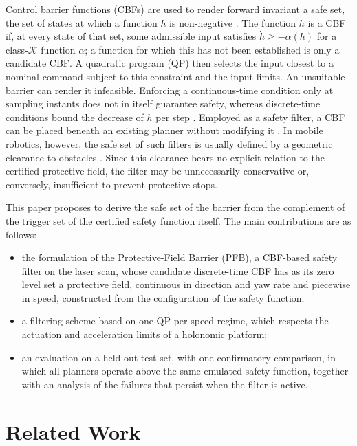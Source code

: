 \documentclass[conference]{IEEEtran}
\begin{document}
Control barrier functions (CBFs) are used to render forward invariant a safe set, the set of states at which a function $h$ is non-negative \cite{ames2017cbfqp,ames2019cbf,garg2024advances}. The
function $h$ is a CBF if, at every state of that set, some admissible input satisfies $\dot h\ge-\alpha(h)$
for a class-$\mathcal{K}$ function $\alpha$; a function for which this has not been established is only a
candidate CBF. A quadratic program (QP) then selects the input closest to a nominal command subject to this
constraint and the input limits. An unsuitable barrier can render it infeasible. Enforcing a continuous-time condition only at sampling instants
does not in itself guarantee safety, whereas discrete-time conditions bound the decrease of $h$ per step \cite{garg2024advances}. Employed
as a safety filter, a CBF can be placed beneath an existing planner without modifying it
\cite{wang2022ensuring}. In mobile robotics, however, the safe set of such filters is usually defined by
a geometric clearance to obstacles \cite{raja2024ogmcbf,zeng2025relvel}. Since this clearance bears no
explicit relation to the certified protective field, the filter may be unnecessarily conservative or,
conversely, insufficient to prevent protective stops.

This paper proposes to derive the safe set of the barrier from the complement of the trigger set of the
certified safety function itself. The main contributions are as follows:
\begin{itemize}
\item the formulation of the Protective-Field Barrier (PFB), a CBF-based safety filter on the laser scan, whose
candidate discrete-time CBF has as its zero level set a protective field, continuous in direction and yaw rate
and piecewise in speed, constructed from the configuration of the safety function;
\item a filtering scheme based on one QP per speed regime, which respects the actuation and acceleration
limits of a holonomic platform;
\item an evaluation on a held-out test set, with one confirmatory comparison, in which all planners operate
above the same emulated safety function, together with an analysis of the failures that persist when the filter is active.
\end{itemize}

\section{Related Work}
\end{document}
